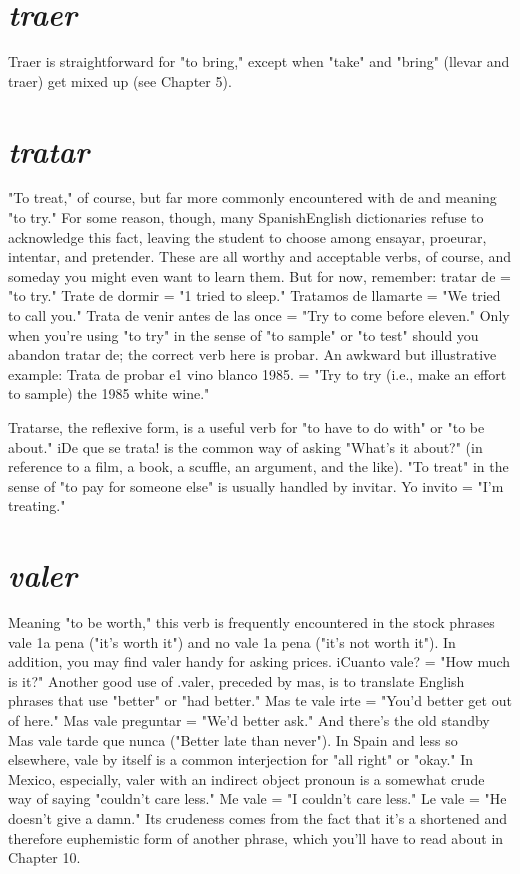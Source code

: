 \documentclass[14pt,a4paper,oneside]{memoir}
\begin{document}
\section{\emph{traer}}

Traer is straightforward for "to bring," except when "take"
and "bring" (llevar and traer) get mixed up (see Chapter 5).

\section{\emph{tratar}}

"To treat," of course, but far more commonly encountered
with de and meaning "to try." For some reason, though, many SpanishEnglish dictionaries refuse to acknowledge this fact, leaving the student to choose among ensayar, proeurar, intentar, and pretender.
These are all worthy and acceptable verbs, of course, and someday you
might even want to learn them. But for now, remember: tratar de =
"to try." Trate de dormir = "1 tried to sleep." Tratamos de llamarte
= "We tried to call you." Trata de venir antes de las once = "Try to
come before eleven." Only when you're using "to try" in the sense of
"to sample" or "to test" should you abandon tratar de; the correct verb
here is probar. An awkward but illustrative example: Trata de probar
e1 vino blanco 1985. = "Try to try (i.e., make an effort to sample) the
1985 white wine."

Tratarse, the reflexive form, is a useful verb for "to have to do
with" or "to be about." iDe que se trata! is the common way of asking
"What's it about?" (in reference to a film, a book, a scuffle, an argument, and the like). "To treat" in the sense of "to pay for someone
else" is usually handled by invitar. Yo invito = "I'm treating."

\section{\emph{valer}}

Meaning "to be worth," this verb is frequently encountered
in the stock phrases vale 1a pena ("it's worth it") and no vale 1a pena
("it's not worth it"). In addition, you may find valer handy for asking
prices. iCuanto vale? = "How much is it?" Another good use of .valer,
preceded by mas, is to translate English phrases that use "better" or
"had better." Mas te vale irte = "You'd better get out of here." Mas
vale preguntar = "We'd better ask." And there's the old standby Mas
vale tarde que nunca ("Better late than never"). In Spain and less so
elsewhere, vale by itself is a common interjection for "all right" or
"okay." In Mexico, especially, valer with an indirect object pronoun
is a somewhat crude way of saying "couldn't care less." Me vale = "I
couldn't care less." Le vale = "He doesn't give a damn." Its crudeness
comes from the fact that it's a shortened and therefore euphemistic
form of another phrase, which you'll have to read about in Chapter 10.
\end{document}
